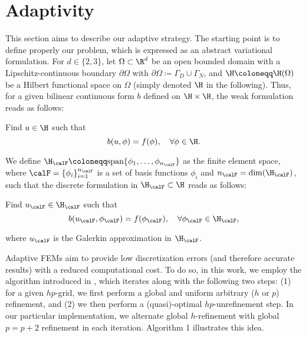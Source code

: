 \section{Adaptivity}
\label{sec:GO-adapt}
This section aims to describe our adaptive strategy. The starting point is to define properly our problem, which is expressed as an abstract variational formulation. For $d \in \{2, 3\}$, let $\Omega\subset \R^{d}$ be an open bounded domain with a Lipschitz-continuous boundary $\partial \Omega$ with $\partial \Omega \coloneqq \Gamma_{D} \cup \Gamma_{N}$, and $\H \coloneqq \H(\Omega)$ be a Hilbert functional space on $\Omega$ (simply denoted $\H$ in the following). Thus, for a given bilinear continuous form $b$ defined on $\H \times \H$, the weak formulation reads as follows:
\begin{var_for}
  Find $u \in \H$ such that
  \begin{equation}
    \label{eq:direct1}
    b(u,\phi)=f(\phi), \quad \forall \phi\in \H.
  \end{equation}
\end{var_for}
\noindent We define $\H_{\calF} \coloneqq \textrm{span}\{\phi_{1}, \dots, \phi_{n_{\calF}}\}$ as the finite element space, where $\calF = \{ \phi_{i} \}_{i=1}^{n_{\calF}}$ is a set of basis functions $\phi_i$ and $n_{\calF} = \textrm{dim}(\H_{\calF})$, such that the discrete formulation in $\H_{\calF} \subset \H$ reads as follows:
\begin{var_for}
  Find $u_{\calF} \in \H_{\calF}$ such that
  \begin{equation}
    \label{eq:directH1}
    b(u_{\calF},\phi_{\calF}) = f(\phi_{\calF}), \quad \forall \phi_{\calF} \in \H_{\calF},
  \end{equation}
\end{var_for}
\noindent where $u_{\calF}$ is the Galerkin approximation in $\H_{\calF}$.

Adaptive \acp{FEM} aim to provide low discretization errors (and therefore accurate results) with a reduced computational cost. To do so, in this work, we employ the algorithm introduced in \cite{darrigrand2020painless}, which iterates along with the following two steps: (1) for a given $hp$-grid, we first perform a global and uniform arbitrary ($h$ or $p$) refinement, and (2) we then perform a (quasi)-optimal $hp$-unrefinement step. In our particular implementation, we alternate global $h$-refinement with global $p=p+2$ refinement in each iteration. Algorithm 1 illustrates this idea.

